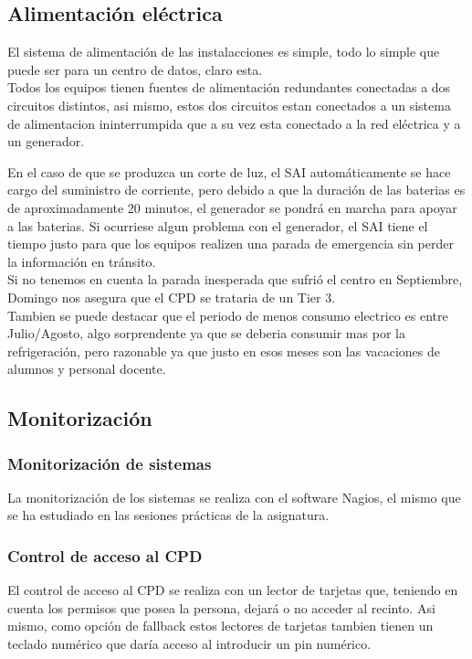 \documentclass[a4paper,11pt]{article}
\begin{document}
\subsection{Alimentación eléctrica}
El sistema de alimentación de las instalacciones es simple, todo lo simple que puede ser para un centro de datos, claro esta.\\
Todos los equipos tienen fuentes de alimentación redundantes conectadas a dos circuitos distintos, asi mismo, estos dos circuitos estan conectados a un sistema de alimentacion ininterrumpida que a su vez esta conectado a la red eléctrica y a un generador.

En el caso de que se produzca un corte de luz, el SAI automáticamente se hace cargo del suministro de corriente, pero debido a que la duración de las baterias es de aproximadamente 20 minutos, el generador se pondrá en marcha para apoyar a las baterias. Si ocurriese algun problema con el generador, el SAI tiene el tiempo justo para que los equipos realizen una parada de emergencia sin perder la información en tránsito.\\

Si no tenemos en cuenta la parada inesperada que sufrió el centro en Septiembre, Domingo nos asegura que el CPD se trataria de un Tier 3.\\

Tambien se puede destacar que el periodo de menos consumo electrico es entre Julio/Agosto, algo sorprendente ya que se deberia consumir mas por la refrigeración, pero razonable ya que justo en esos meses son las vacaciones de alumnos y personal docente.

\subsection{Monitorización}
\subsubsection{Monitorización de sistemas}
La monitorización de los sistemas se realiza con el software Nagios, el mismo que se ha estudiado en las sesiones prácticas de la asignatura.
\subsubsection{Control de acceso al CPD}
El control de acceso al CPD se realiza con un lector de tarjetas que, teniendo en cuenta los permisos que posea la persona, dejará o no acceder al recinto. Asi mismo, como opción de fallback estos lectores de tarjetas tambien tienen un teclado numérico que daría acceso al introducir un pin numérico.
\end{document}
